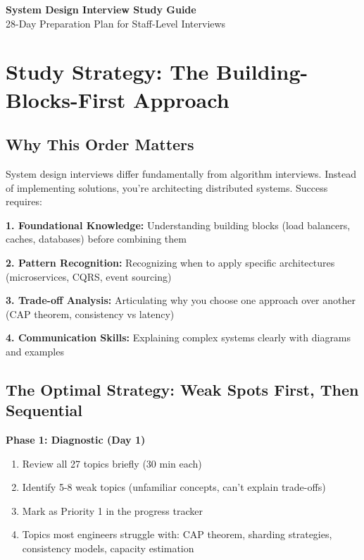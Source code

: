 \documentclass[10pt]{article}
\begin{document}
\begin{center}
\textbf{\LARGE System Design Interview Study Guide} \\
\large{28-Day Preparation Plan for Staff-Level Interviews}
\end{center}

\section{Study Strategy: The Building-Blocks-First Approach}

\subsection{Why This Order Matters}

System design interviews differ fundamentally from algorithm interviews. Instead of implementing solutions, you're architecting distributed systems. Success requires:

\textbf{1. Foundational Knowledge:} Understanding building blocks (load balancers, caches, databases) before combining them

\textbf{2. Pattern Recognition:} Recognizing when to apply specific architectures (microservices, CQRS, event sourcing)

\textbf{3. Trade-off Analysis:} Articulating why you choose one approach over another (CAP theorem, consistency vs latency)

\textbf{4. Communication Skills:} Explaining complex systems clearly with diagrams and examples

\subsection{The Optimal Strategy: Weak Spots First, Then Sequential}

\textbf{Phase 1: Diagnostic (Day 1)}
\begin{enumerate}
\item Review all 27 topics briefly (30 min each)
\item Identify 5-8 weak topics (unfamiliar concepts, can't explain trade-offs)
\item Mark as Priority 1 in the progress tracker
\item Topics most engineers struggle with: CAP theorem, sharding strategies, consistency models, capacity estimation
\end{enumerate}
\end{document}
